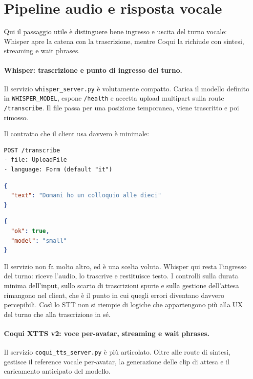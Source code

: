 \section{Pipeline audio e risposta vocale}
Qui il passaggio utile è distinguere bene ingresso e uscita del turno vocale: Whisper apre la catena con la trascrizione, mentre Coqui la richiude con sintesi, streaming e wait phrases.

\paragraph{Whisper: trascrizione e punto di ingresso del turno.}
Il servizio \texttt{whisper\_server.py} è volutamente compatto. Carica il modello definito in \texttt{WHISPER\_MODEL}, espone \texttt{/health} e accetta upload multipart sulla route \texttt{/transcribe}. Il file passa per una posizione temporanea, viene trascritto e poi rimosso.

Il contratto che il client usa davvero è minimale:

\begin{lstlisting}[basicstyle=\ttfamily\small,breaklines=true,caption={Campi usati da \texttt{/transcribe}.}]
POST /transcribe
- file: UploadFile
- language: Form (default "it")
\end{lstlisting}

\begin{lstlisting}[language=json,caption={Risposta tipica di \texttt{/transcribe}.}]
{
  "text": "Domani ho un colloquio alle dieci"
}
\end{lstlisting}

\begin{lstlisting}[language=json,caption={Risposta tipica di \texttt{/health} nel servizio Whisper.}]
{
  "ok": true,
  "model": "small"
}
\end{lstlisting}

Il servizio non fa molto altro, ed è una scelta voluta. Whisper qui resta l'ingresso del turno: riceve l'audio, lo trascrive e restituisce testo. I controlli sulla durata minima dell'input, sullo scarto di trascrizioni spurie e sulla gestione dell'attesa rimangono nel client, che è il punto in cui quegli errori diventano davvero percepibili. Così lo STT non si riempie di logiche che appartengono più alla UX del turno che alla trascrizione in sé.

\paragraph{Coqui XTTS v2: voce per-avatar, streaming e wait phrases.}
Il servizio \texttt{coqui\_tts\_server.py} è più articolato. Oltre alle route di sintesi, gestisce il reference vocale per-avatar, la generazione delle clip di attesa e il caricamento anticipato del modello.

